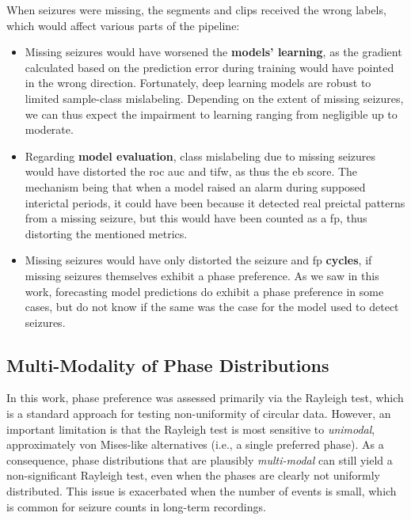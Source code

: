 When seizures were missing, the segments and clips received the wrong labels, which would affect various parts of the pipeline:

\begin{itemize}
    \item Missing seizures would have worsened the \textbf{models' learning}, as the gradient calculated based on the prediction error during training would have pointed in the wrong direction.
    Fortunately, deep learning models are robust to limited sample-class mislabeling.
    Depending on the extent of missing seizures, we can thus expect the impairment to learning ranging from negligible up to moderate.

    \item Regarding \textbf{model evaluation}, class mislabeling due to missing seizures would have distorted the \gls{roc auc} and \gls{tifw}, as thus the \gls{eb} score.
    The mechanism being that when a model raised an alarm during supposed interictal periods, it could have been because it detected real preictal patterns from a missing seizure, but this would have been counted as a \gls{fp}, thus distorting the mentioned metrics.

    \item Missing seizures would have only distorted the seizure and \gls{fp} \textbf{cycles}, if missing seizures themselves exhibit a phase preference.
    As we saw in this work, forecasting model predictions do exhibit a phase preference in some cases, but do not know if the same was the case for the model used to detect seizures.
\end{itemize}

\subsection{Multi-Modality of Phase Distributions}
In this work, phase preference was assessed primarily via the Rayleigh test, which is a standard approach for testing non-uniformity of circular data.
However, an important limitation is that the Rayleigh test is most sensitive to \emph{unimodal}, approximately von Mises-like alternatives (i.e., a single preferred phase).
As a consequence, phase distributions that are plausibly \emph{multi-modal} can still yield a non-significant Rayleigh test, even when the phases are clearly not uniformly distributed.
This issue is exacerbated when the number of events is small, which is common for seizure counts in long-term recordings.

